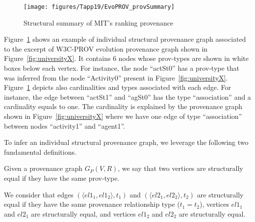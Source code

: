 \begin{figure}[t]
\centering
\texttt{[image: figures/Tapp19/EvoPROV\_provSummary]}
\caption{Structural summary of MIT's ranking provenance}
\label{scheme:universityX}
\end{figure}
Figure~\ref{scheme:universityX} shows an example of individual structural provenance graph associated to the excerpt of W3C-PROV evolution provenance graph shown in Figure~\ref{fig:universityX}.  It contains 6 nodes whose prov-types are shown in white boxes below each vertex. For instance, the node ``actSt0'' has a prov-type that was inferred from the node ``Activity0'' present in Figure~\ref{fig:universityX}. 
Figure~\ref{scheme:universityX} depicts also cardinalities and types associated with each edge.
For instance, the edge between ``actSt1'' and ``agSt0'' has the type ``association'' and a cardinality equals to one.
The cardinality is explained by the provenance graph shown in Figure~\ref{fig:universityX} where we have one edge of type ``association'' between nodes ``activity1'' and ``agent1''.




To infer an individual structural provenance graph, we leverage the following two fundamental definitions.
\begin{definition}
    \label{lm:vert}
Given a provenance graph $G_P(V, R)$, we say that two vertices are structurally equal if they have the same prov-type.
\end{definition}
\begin{definition}
  \label{lm:edge} 
We consider that edges $(\langle el1_{1},el1_{2}\rangle,t_{1})$ and $(\langle el2_{1},el2_{2}\rangle,t_{2})$ are structurally equal if they have the same provenance relationship type ($t_1=t_2$),  
vertices $el1_1$ and $el2_1$  are structurally equal,  and vertices $el1_2$ and $el2_2$  are structurally equal.
\end{definition}


